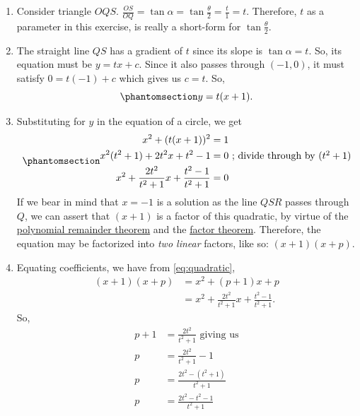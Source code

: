 \documentclass[
  a4paper,
]{article}
\begin{document}
\begin{enumerate}
\item
  Consider triangle \(OQS\).
  \(\frac{OS}{OQ} = \tan\alpha = \tan\frac{\theta}{2} = \frac{t}{1} = t\).
  Therefore, \(t\) as a parameter in this exercise, is really a
  short-form for \(\tan\frac{\theta}{2}\).
\item
  The straight line \(QS\) has a gradient of \(t\) since its slope is
  \(\tan\alpha = t\). So, its equation must be \(y = tx + c\). Since it
  also passes through \((-1, 0)\), it must satisfy \(0 = t(-1) + c\)
  which gives us \(c = t\). So,
  \begin{equation}\phantomsection\label{eq:stline}{
  y = t(x + 1).
  }\end{equation}
\item
  Substituting for \(y\) in the equation of a circle, we get
  \begin{equation}\phantomsection\label{eq:quadratic}{
  \begin{aligned}
  x^2 +(t(x + 1))^2 &= 1\\
  x^2(t^2 + 1) + 2t^2x + t^2 - 1 &= 0 \mbox{ ; divide through by $(t^2 + 1)$}\\
  x^2 + \frac{2t^2}{t^2 + 1}x + \frac{t^2 - 1}{t^2 +1} &= 0
  \end{aligned}
  }\end{equation} If we bear in mind that \(x = -1\) is a solution as
  the line \(QSR\) passes through \(Q\), we can assert that \((x + 1)\)
  is a factor of this quadratic, by virtue of the
  \href{https://en.wikipedia.org/wiki/Polynomial_remainder_theorem}{polynomial
  remainder theorem} and the
  \href{https://en.wikipedia.org/wiki/Factor_theorem}{factor theorem}.
  Therefore, the equation may be factorized into \emph{two linear}
  factors, like so: \((x + 1)(x + p)\).
\item
  Equating coefficients, we have from \cref{eq:quadratic}, \[
  \begin{aligned}
  (x + 1)(x + p) &= x^2 + (p + 1)x + p \\
  &= x^2 + \frac{2t^2}{t^2 + 1}x + \frac{t^2 - 1}{t^2 +1}.
  \end{aligned}
  \] So, \[
  \begin{aligned}
  p + 1 &= \frac{2t^2}{t^2 + 1} \mbox{ giving us}\\
  p &= \frac{2t^2}{t^2 + 1} - 1\\
  p &= \frac{2t^2 - (t^2 + 1)}{t^2 + 1}\\
  p &= \frac{2t^2 - t^2 - 1}{t^2 + 1}\\

\end{aligned}\]
\end{enumerate}
\end{document}
